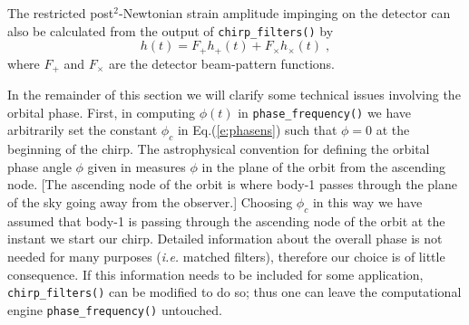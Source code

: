 The restricted post$^2$-Newtonian strain amplitude
impinging on the detector can also be calculated from the
output of {\tt chirp\_filters()} by
\begin{equation}
h(t) = F_+ h_+(t) + F_\times h_{\times}(t) \; ,
\end{equation}
where $F_+$ and $F_\times$ are the detector beam-pattern functions.

In the remainder of this section we will clarify some technical issues 
involving the orbital phase. 
First, in computing  $\phi (t)$ in {\tt phase\_frequency()} we have arbitrarily
set the constant $\phi_c$ in Eq.(\ref{e:phasens})
such that $\phi=0$ at the beginning of the chirp.
The astrophysical convention for defining the 
orbital phase angle $\phi$ given in \cite{willwiseman}
measures $\phi$ in the plane of the orbit from the ascending node.
[The ascending node of the orbit is where body-1 passes through the plane
of the sky going away from the observer.]
Choosing $\phi_c$ in this way we have assumed that
body-1 is passing through the ascending node of the orbit
at the instant we start our chirp.
Detailed information about the overall phase 
is not needed for many purposes ({\it i.e.} matched filters),
therefore our choice is of little consequence.
If this information  needs to be included for some application,
{\tt chirp\_filters()} can be modified to do so;
thus one can leave the computational engine {\tt phase\_frequency()} 
untouched.

